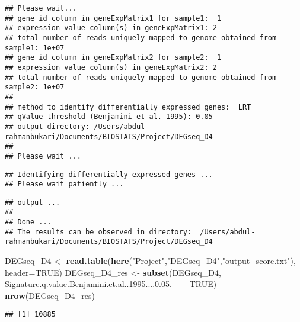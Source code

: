 \documentclass[]{article}
\newenvironment{Shaded}{\begin{snugshade}}{\end{snugshade}}
\newcommand{\DataTypeTok}[1]{\textcolor[rgb]{0.13,0.29,0.53}{#1}}
\newcommand{\DecValTok}[1]{\textcolor[rgb]{0.00,0.00,0.81}{#1}}
\newcommand{\FloatTok}[1]{\textcolor[rgb]{0.00,0.00,0.81}{#1}}
\newcommand{\KeywordTok}[1]{\textcolor[rgb]{0.13,0.29,0.53}{\textbf{#1}}}
\newcommand{\NormalTok}[1]{#1}
\newcommand{\OperatorTok}[1]{\textcolor[rgb]{0.81,0.36,0.00}{\textbf{#1}}}
\newcommand{\OtherTok}[1]{\textcolor[rgb]{0.56,0.35,0.01}{#1}}
\newcommand{\StringTok}[1]{\textcolor[rgb]{0.31,0.60,0.02}{#1}}
\begin{document}
\begin{verbatim}
## Please wait...
## gene id column in geneExpMatrix1 for sample1:  1 
## expression value column(s) in geneExpMatrix1: 2 
## total number of reads uniquely mapped to genome obtained from sample1: 1e+07 
## gene id column in geneExpMatrix2 for sample2:  1 
## expression value column(s) in geneExpMatrix2: 2 
## total number of reads uniquely mapped to genome obtained from sample2: 1e+07 
## 
## method to identify differentially expressed genes:  LRT 
## qValue threshold (Benjamini et al. 1995): 0.05 
## output directory: /Users/abdul-rahmanbukari/Documents/BIOSTATS/Project/DEGseq_D4 
## 
## Please wait ...
\end{verbatim}

\begin{verbatim}
## Identifying differentially expressed genes ...
## Please wait patiently ...
\end{verbatim}

\begin{verbatim}
## output ...
## 
## Done ...
## The results can be observed in directory:  /Users/abdul-rahmanbukari/Documents/BIOSTATS/Project/DEGseq_D4
\end{verbatim}

\begin{Shaded}
\begin{Highlighting}[]
\NormalTok{DEGseq_D4 <-}\StringTok{ }\KeywordTok{read.table}\NormalTok{(}\KeywordTok{here}\NormalTok{(}\StringTok{"Project"}\NormalTok{,}\StringTok{"DEGseq_D4"}\NormalTok{,}\StringTok{"output_score.txt"}\NormalTok{), }\DataTypeTok{header=}\OtherTok{TRUE}\NormalTok{)}
\NormalTok{DEGseq_D4_res <-}\StringTok{ }\KeywordTok{subset}\NormalTok{(DEGseq_D4, Signature.q.value.Benjamini.et.al..}\DecValTok{1995}\NormalTok{....}\DecValTok{0}\NormalTok{.}\FloatTok{05.} \OperatorTok{==}\OtherTok{TRUE}\NormalTok{)}
\KeywordTok{nrow}\NormalTok{(DEGseq_D4_res)}
\end{Highlighting}
\end{Shaded}

\begin{verbatim}
## [1] 10885
\end{verbatim}

\begin{Shaded}
\end{Shaded}
\end{document}
